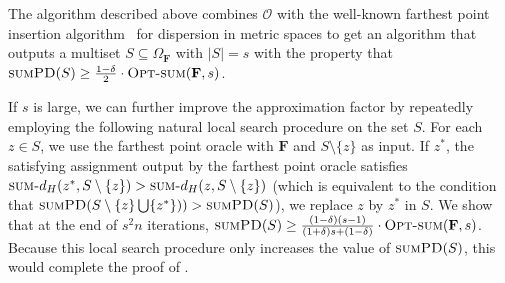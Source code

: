 \documentclass[11pt, letterpaper]{article}
\theoremstyle{definition}
\newcommand{\f}{\mathbf{F}}
\newcommand{\Om}{\Omega_{\f}}
\newcommand{\SPD}{\textsc{sumPD}}
\newcommand{\sumd}{\textsc{sum-}d_H}
\newcommand{\opts}{\textsc{Opt-sum}}
\begin{document}
\medskip \noindent
The algorithm described above combines $\mathcal{O}$ with the well-known farthest point insertion algorithm~\cite{ravi1994heuristic} for dispersion in metric spaces to get an algorithm that outputs a multiset $S \subseteq \Om$ with $|S|=s$ with the property that $\SPD(S) \geq \frac{1 - \delta}{2} \cdot \opts(\f,s)$.

\medskip \noindent
If $s$ is large, we can further improve the approximation factor by repeatedly employing the following natural local search procedure on the set $S$. For each $z \in S$, we use the farthest point oracle with $\f$ and $S \setminus \{z\}$ as input. If $z^*$, the satisfying assignment output by the farthest point oracle satisfies $\sumd(z^*, S\setminus\{z\}) > \sumd(z, S\setminus\{z\})$ (which is equivalent to the condition that $\SPD(S \setminus \{z\} \bigcup \{z^*\})) > \SPD(S)$), we replace $z$ by $z^*$ in $S$. We show that at the end of $s^2n$ iterations, $\SPD(S) \geq \frac{(1-\delta)(s-1)}{(1+\delta)s+(1-\delta)} \cdot \opts(\f,s)$. Because this local search procedure only increases the value of $\SPD(S)$, this would complete the proof of .
\end{document}
